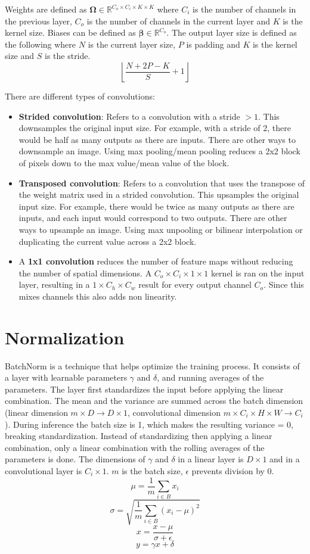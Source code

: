 \documentclass{article}
\begin{document}
Weights are defined as $\boldsymbol{\Omega} \in \mathbb{R}^{C_o \times C_i \times K \times K}$ where $C_i$ is the number of channels in the previous layer, $C_o$ is the number of channels in the current layer and $K$ is the kernel size. Biases can be defined as $\boldsymbol{\beta} \in \mathbb{R}^{C_o}$. The output layer size is defined as the following where $N$ is the current layer size, $P$ is padding and $K$ is the kernel size and $S$ is the stride.
\[ \left\lfloor \frac{N + 2P - K}{S} + 1 \right\rfloor \]

There are different types of convolutions:
\begin{itemize}
  \item \textbf{Strided convolution}: Refers to a convolution with a stride $> 1$. This downsamples the original input size. For example, with a stride of 2, there would be half as many outputs as there are inputs. There are other ways to downsample an image. Using max pooling/mean pooling reduces a 2x2 block of pixels down to the max value/mean value of the block.
  \item \textbf{Transposed convolution}: Refers to a convolution that uses the transpose of the weight matrix used in a strided convolution. This upsamples the original input size. For example, there would be twice as many outputs as there are inputs, and each input would correspond to two outputs. There are other ways to upsample an image. Using max unpooling or bilinear interpolation or duplicating the current value across a 2x2 block.
  \item A \textbf{1x1 convolution} reduces the number of feature maps without reducing the number of spatial dimensions. A $C_o \times C_i \times 1 \times 1$ kernel is ran on the input layer, resulting in a $1 \times C_h \times C_w$ result for every output channel $C_o$. Since this mixes channels this also adds non linearity.
\end{itemize}

\section{Normalization}
BatchNorm is a technique that helps optimize the training process. It consists of a layer with learnable parameters $\gamma$ and $\delta$, and running averages of the parameters. The layer first standardizes the input before applying the linear combination.
The mean and the variance are summed across the batch dimension (linear dimension $m \times D \rightarrow D \times 1$, convolutional dimension $m \times C_i \times H \times W \rightarrow C_i$). During inference the batch size is 1, which makes the resulting variance = 0, breaking standardization. Instead of standardizing then applying a linear combination, only a linear combination with the rolling averages of the parameters is done.
The dimensions of $\gamma$ and $\delta$ in a linear layer is $D \times 1$ and in a convolutional layer is $C_i \times 1$. $m$ is the batch size, $\epsilon$ prevents division by 0.
\[ \mu = \frac{1}{m} \sum_{i \in B} x_i \]
\[ \sigma = \sqrt{\frac{1}{m} \sum_{i \in B} (x_i - \mu)^2 } \]
\[ x = \frac{x - \mu}{\sigma + \epsilon} \]
\[ y = \gamma x + \delta \]
\end{document}
